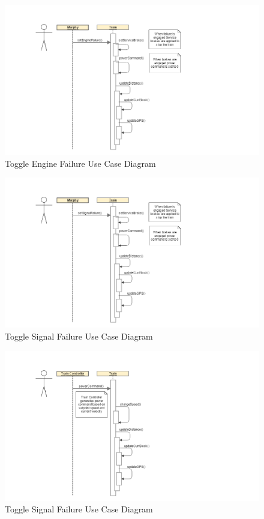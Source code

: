 \documentclass[]{article}
\begin{document}
\begin{figure}[H]
	\centering
	\includegraphics[scale=.3]{train_model_sqd_toggle_engine_failure.png}
	\caption{Toggle Engine Failure Use Case Diagram}
\end{figure}

\begin{figure}[H]
	\centering
	\includegraphics[scale=.3]{train_model_sqd_toggle_signal_failure.png}
	\caption{Toggle Signal Failure Use Case Diagram}
\end{figure}

\begin{figure}[H]
	\centering
	\includegraphics[scale=.3]{train_model_sqd_set_power.png}
	\caption{Toggle Signal Failure Use Case Diagram}
\end{figure}
\end{document}
